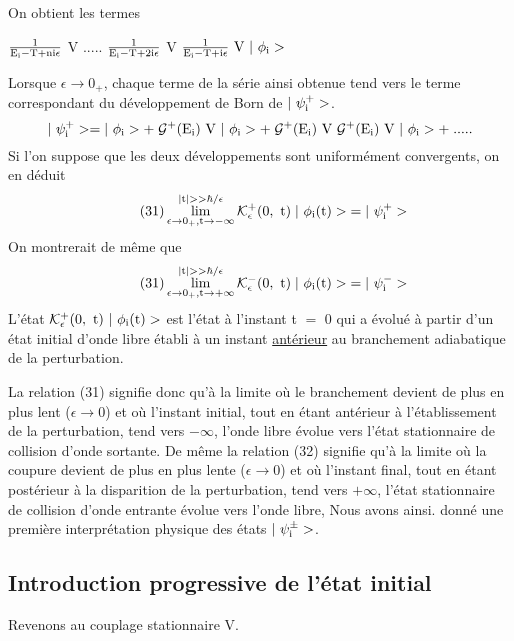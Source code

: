 On obtient les termes
\begin{center}
$\frac{1}{\text{E}_{\text{i}}-\text{T}+\text{ni}\epsilon}$ V .....
$\frac{1}{\text{E}_{\text{i}}-\text{T}+2\text{i}\epsilon}$ V 
$\frac{1}{\text{E}_{\text{i}}-\text{T}+\text{i}\epsilon}\text{ V }|\ \phi_{\text{i}}>$
\end{center}
Lorsque $\epsilon\to0_+$, chaque terme de la série ainsi obtenue tend vers le terme
correspondant du développement de Born de $|\ \psi_\mt{i}^+>$.
\[
|\ \psi_\mt{i}^+>=|\ \phi_\mt{i}>
+\;\mc{G}^+(\mt{E}_\mt{i})\mt{ V }|\ \phi_\mt{i}>
+\;\mc{G}^+(\mt{E}_\mt{i})\mt{ V }\mc{G}^+(\mt{E}_\mt{i})\mt{ V }|\ \phi_\mt{i}>+\;.....
\]
Si l'on suppose que les deux développements sont uniformément convergents,
on en déduit
\[
\tag{31}\lim_{\epsilon\to0_+,\mt{t}\to-\infty} ^{|\mt{t}|>>\hbar/\epsilon}
\mc{K}^+_\epsilon(0,\mt{ t})\;|\ \phi_\mt{i}\mt{(t)}>\;=|\ \psi_\mt{i}^+>
\]
On montrerait de même que
\[
\tag{31}\lim_{\epsilon\to0_+,\mt{t}\to+\infty} ^{|\mt{t}|>>\hbar/\epsilon}
\mc{K}^-_\epsilon(0,\mt{ t})\;|\ \phi_\mt{i}\mt{(t)}>\;=|\ \psi_\mt{i}^->
\]
L'état $\mc{K}^+_\epsilon(0,\mt{ t})\ |\ \phi_\mt{i}\mt{(t)}>$ est l'état à l'instant t $=$ 0 qui a évolué à
partir d'un état initial d'onde libre établi à un instant \ul{antérieur} au
branchement adiabatique de la perturbation.

La relation (31) signifie donc qu'à la limite où le branchement
devient de plus en plus lent ($\epsilon\to0$) et où l'instant initial, tout en étant
antérieur à l'établissement de la perturbation, tend vers $-\infty$, l'onde libre
évolue vers l'état stationnaire de collision d'onde sortante. De même la
relation (32) signifie qu'à la limite où la coupure devient de plus en plus
lente ($\epsilon\to0$) et où l'instant final, tout en étant postérieur à la disparition
de la perturbation, tend vers $+\infty$, l'état stationnaire de collision
d'onde entrante évolue vers l'onde libre, Nous avons ainsi. donné une première
interprétation physique des états $|\ \psi_{\text{i}}^\pm>$.
\subsection{Introduction progressive de l'état initial}%
Revenons au couplage stationnaire V.

